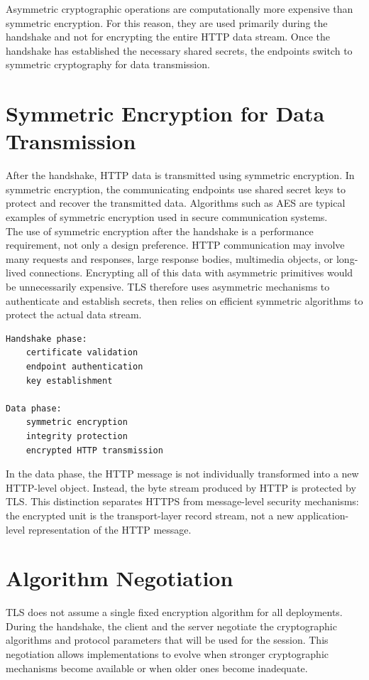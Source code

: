 \documentclass{scrbook}
\begin{document}
Asymmetric cryptographic operations are computationally more expensive than symmetric encryption. For this reason, they are used primarily during the handshake and not for encrypting the entire HTTP data stream. Once the handshake has established the necessary shared secrets, the endpoints switch to symmetric cryptography for data transmission.

\section{Symmetric Encryption for Data Transmission}

After the handshake, HTTP data is transmitted using symmetric encryption. In symmetric encryption, the communicating endpoints use shared secret keys to protect and recover the transmitted data. Algorithms such as AES are typical examples of symmetric encryption used in secure communication systems.\\

The use of symmetric encryption after the handshake is a performance requirement, not only a design preference. HTTP communication may involve many requests and responses, large response bodies, multimedia objects, or long-lived connections. Encrypting all of this data with asymmetric primitives would be unnecessarily expensive. TLS therefore uses asymmetric mechanisms to authenticate and establish secrets, then relies on efficient symmetric algorithms to protect the actual data stream.

\begin{lstlisting}
Handshake phase:
    certificate validation
    endpoint authentication
    key establishment

Data phase:
    symmetric encryption
    integrity protection
    encrypted HTTP transmission
\end{lstlisting}

In the data phase, the HTTP message is not individually transformed into a new HTTP-level object. Instead, the byte stream produced by HTTP is protected by TLS. This distinction separates HTTPS from message-level security mechanisms: the encrypted unit is the transport-layer record stream, not a new application-level representation of the HTTP message.

\section{Algorithm Negotiation}

TLS does not assume a single fixed encryption algorithm for all deployments. During the handshake, the client and the server negotiate the cryptographic algorithms and protocol parameters that will be used for the session. This negotiation allows implementations to evolve when stronger cryptographic mechanisms become available or when older ones become inadequate.\\
\end{document}
